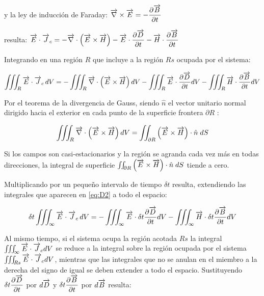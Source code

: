 y la ley de inducción de Faraday: $\overrightarrow{\nabla}\times\overrightarrow{E}=-\dfrac{\partial \overrightarrow{B}}{\partial t}$ 

resulta: $\overrightarrow{E}\cdot\overrightarrow{J}_{c} = -\overrightarrow{\nabla}\cdot \left( \overrightarrow{E}\times\overrightarrow{H} \right) -\overrightarrow{E} \cdot \dfrac{\partial \overrightarrow{D}}{\partial t} -\overrightarrow{H} \cdot \dfrac{\partial \overrightarrow{B}}{\partial t} $

Integrando en una región $R$ que incluye a la región $Rs$ ocupada por el sistema:

\begin{equation}
	\label{eq:D2}
	\iiint_{R}\overrightarrow{E}\cdot\overrightarrow{J}_{c}\,dV = -\iiint_{R}\overrightarrow{\nabla}\cdot \left( \overrightarrow{E}\times\overrightarrow{H} \right)dV -\iiint_{R}\overrightarrow{E} \cdot \dfrac{\partial \overrightarrow{D}}{\partial t}dV -\iiint_{R}\overrightarrow{H} \cdot \dfrac{\partial \overrightarrow{B}}{\partial t}dV
\end{equation}

Por el teorema de la divergencia de Gauss, siendo $\hat{n}$ el vector unitario normal dirigido hacia el exterior en cada punto de la superficie frontera $\partial R$ \citep{Santalo1}:

\begin{equation*}
	\iiint_{R}\overrightarrow{\nabla}\cdot \left( \overrightarrow{E}\times\overrightarrow{H} \right)dV =\iint_{\partial R} \left( \overrightarrow{E}\times\overrightarrow{H} \right) \cdot \hat{n}\; dS
\end{equation*}

\begin{sloppypar}
Si los campos son casi-estacionarios y la región se agranda cada vez más en todas direcciones, la integral de superficie ${\iint_{\partial R} \left( \overrightarrow{E}\times\overrightarrow{H} \right) \cdot \hat{n} \; dS}$ tiende a cero.
\end{sloppypar} 
 
 
Multiplicando por un pequeño intervalo de tiempo $\delta t$ resulta, extendiendo las integrales que aparecen en \ref{eq:D2} a todo el espacio:

\begin{equation}
	\label{eq:D3}
	\delta t \iiint_{\infty}\overrightarrow{E}\cdot\overrightarrow{J}_{c}\,dV = -\iiint_{\infty}\overrightarrow{E} \cdot \delta t \dfrac{\partial \overrightarrow{D}}{\partial t}dV -\iiint_{\infty}\overrightarrow{H} \cdot \delta t \dfrac{\partial \overrightarrow{B}}{\partial t}dV
\end{equation}

\begin{sloppypar}
Al mismo tiempo, si el sistema ocupa la región acotada $Rs$ la integral ${\iiint_{\infty}\overrightarrow{E}\cdot\overrightarrow{J}_{c}dV}$ se reduce a la integral sobre la región ocupada por el sistema ${\iiint_{Rs}\overrightarrow{E}\cdot\overrightarrow{J}_{c}dV}$, mientras que
las integrales que no se anulan en el miembro a la derecha del signo de igual se deben extender a todo el espacio. Sustituyendo ${\delta t \dfrac{\partial \overrightarrow{D}}{\partial t}}$ por $d\overrightarrow{D}$ y ${\delta t \dfrac{\partial \overrightarrow{B}}{\partial t}}$ por $d\overrightarrow{B}$ resulta:
\end{sloppypar}


